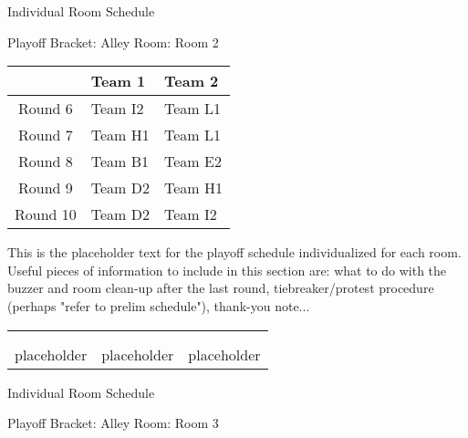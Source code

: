 \documentclass{article}%
\begin{document}
\newpage%
\begin{center}%
\begin{Huge}%
Individual Room Schedule%
\end{Huge}%
\vspace*{16pt}%
\linebreak%
\begin{Large}%
Playoff Bracket: Alley \hfill Room: Room 2%
\end{Large}%
\end{center}%
%
\begin{tabularx}{\textwidth}{|c|Y|Y|}%
\hline%
&Team 1&Team 2\\%
\hline%
Round 6&Team I2&Team L1\\%
Round 7&Team H1&Team L1\\%
Round 8&Team B1&Team E2\\%
Round 9&Team D2&Team H1\\%
Round 10&Team D2&Team I2\\%
\hline%
\end{tabularx}%
\vspace*{16pt}%
\linebreak%
This is the placeholder text for the playoff schedule individualized for each room. Useful pieces of information to include in this section are: what to do with the buzzer and room clean{-}up after the last round, tiebreaker/protest procedure (perhaps "refer to prelim schedule"), thank{-}you note...%
\vspace*{30pt}%
\newline%
%
\begin{tabularx}{\textwidth}{YYY}%
  &  &  \\%
\\%
placeholder&placeholder&placeholder\\%
\end{tabularx}%
\newpage%
\begin{center}%
\begin{Huge}%
Individual Room Schedule%
\end{Huge}%
\vspace*{16pt}%
\linebreak%
\begin{Large}%
Playoff Bracket: Alley \hfill Room: Room 3%
\end{Large}%
\end{center}%
\end{document}
